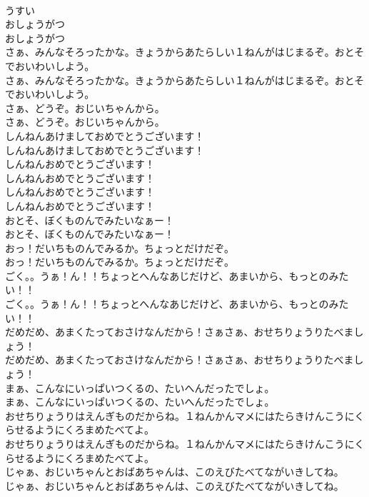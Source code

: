 \documentclass[8pt]{extreport}
\begin{document}
\begin{CJK}{UTF8}{min}
\\	うすい
\\	おしょうがつ	
\\	おしょうがつ 
\\	さぁ、みんなそろったかな。きょうからあたらしい１ねんがはじまるぞ。おとそでおいわいしよう。	
\\	さぁ、みんなそろったかな。きょうからあたらしい１ねんがはじまるぞ。おとそでおいわいしよう。 
\\	さぁ、どうぞ。おじいちゃんから。	
\\	さぁ、どうぞ。おじいちゃんから。 
\\	しんねんあけましておめでとうございます！	
\\	しんねんあけましておめでとうございます！ 
\\	しんねんおめでとうございます！	
\\	しんねんおめでとうございます！ 
\\	しんねんおめでとうございます！	
\\	しんねんおめでとうございます！ 
\\	おとそ、ぼくものんでみたいなぁー！	
\\	おとそ、ぼくものんでみたいなぁー！ 
\\	おっ！だいちものんでみるか。ちょっとだけだぞ。	
\\	おっ！だいちものんでみるか。ちょっとだけだぞ。 
\\	ごく。。うぁ！ん！！ちょっとへんなあじだけど、あまいから、もっとのみたい！！	
\\	ごく。。うぁ！ん！！ちょっとへんなあじだけど、あまいから、もっとのみたい！！ 
\\	だめだめ、あまくたっておさけなんだから！さぁさぁ、おせちりょうりたべましょう！	
\\	だめだめ、あまくたっておさけなんだから！さぁさぁ、おせちりょうりたべましょう！ 
\\	まぁ、こんなにいっぱいつくるの、たいへんだったでしょ。	
\\	まぁ、こんなにいっぱいつくるの、たいへんだったでしょ。 
\\	おせちりょうりはえんぎものだからね。１ねんかんマメにはたらきけんこうにくらせるようにくろまめたべてよ。	
\\	おせちりょうりはえんぎものだからね。１ねんかんマメにはたらきけんこうにくらせるようにくろまめたべてよ。 
\\	じゃぁ、おじいちゃんとおばあちゃんは、このえびたべてながいきしてね。	
\\	じゃぁ、おじいちゃんとおばあちゃんは、このえびたべてながいきしてね。 

\end{CJK}
\end{document}
